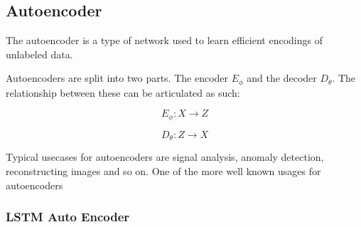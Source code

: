 \subsection{Autoencoder}

The autoencoder is a type of network used to learn efficient encodings of unlabeled data. 

Autoencoders are split into two parts. The encoder $E_\phi$ and the decoder $D_\theta$. The relationship between these can be articulated as such: 

\begin{equation}
E_\phi: X \rightarrow Z 
\end{equation}

\begin{equation}
D_\theta: Z \rightarrow X
\end{equation}


Typical usecases for autoencoders are signal analysis, anomaly detection, reconstructing images and so on. 
One of the more well known usages for autoencoders

\subsubsection{LSTM Auto Encoder}
